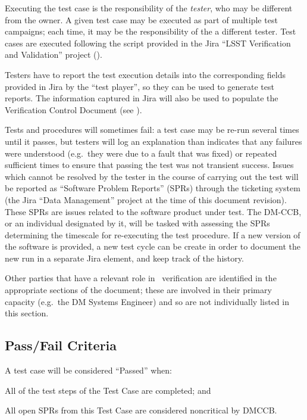 Executing the test case is the responsibility of the \emph{tester}, who may be different from the owner.
A given test case may be executed as part of multiple test campaigns; each time, it may be the responsibility of the a different tester.
Test cases are executed following the script provided in the Jira ``LSST Verification and Validation'' project ().

Testers have to report the test execution details into the corresponding fields provided in Jira by the ``test player'',  so they can be used to generate test reports.
The information captured in Jira will also be used to populate the Verification Control Document (see ).

Tests and procedures will sometimes fail: a test case may be re-run several times until it passes, but testers will log an explanation than indicates that any failures were understood (e.g.\ they were due to a fault that was fixed) or repeated sufficient times to ensure that passing the test was not transient success.
Issues which cannot be resolved by the tester in the course of carrying out the test will be reported as ``Software Problem Reports'' (SPRs) through the \product{} ticketing system (the Jira ``Data Management'' project at the time of this document revision).
These SPRs are issues related to the software product under test.
The DM-CCB, or an individual designated by it, will be tasked with assessing the SPRs determining the timescale for re-executing the test procedure.
If a new version of the software is provided, a new test cycle can be create in order to document the new run in a separate Jira element, and keep track of the history.

Other parties that have a relevant role in \product\ verification are identified in the appropriate sections of the document; these are involved in their primary capacity (e.g.\ the DM Systems Engineer) and so are not individually listed in this section.

\subsection{Pass/Fail Criteria}

A test case will be considered ``Passed'' when:

\begin{itemize_single}
\item{All of the test steps of the Test Case are completed; and}
\item{All open SPRs from this Test Case are considered noncritical by DMCCB.}
\end{itemize_single}

